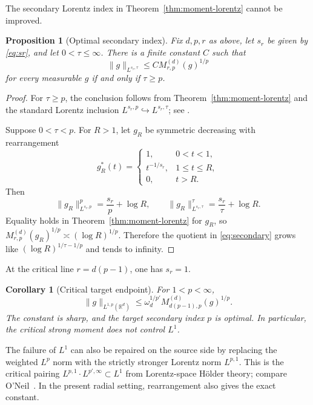\documentclass[11pt]{amsart}
\newtheorem{proposition}[theorem]{Proposition}
\newtheorem{corollary}[theorem]{Corollary}
\theoremstyle{remark}
\newcommand{\R}{\mathbb R}
\newcommand{\norm}[1]{\lVert #1\rVert}
\newcommand{\Mrp}{M_{r,p}^{(d)}}
\renewcommand{\Mc}{M_{d(p-1),p}^{(d)}}
\begin{document}
The secondary Lorentz index in Theorem~\ref{thm:moment-lorentz} cannot be
improved.

\begin{proposition}[Optimal secondary index]\label{prop:secondary}
Fix $d,p,r$ as above, let $s_r$ be given by \eqref{eq:sr}, and let
$0<\tau\le\infty$.  There is a finite constant $C$ such that
\begin{equation}\label{eq:secondary}
 \norm{g}_{L^{s_r,\tau}}
 \le C\Mrp(g)^{1/p}
\end{equation}
for every measurable $g$ if and only if $\tau\ge p$.
\end{proposition}

\begin{proof}
For $\tau\ge p$, the conclusion follows from
Theorem~\ref{thm:moment-lorentz} and the standard Lorentz inclusion
$L^{s_r,p}\hookrightarrow L^{s_r,\tau}$; see
\cite{BennettSharpley}.

Suppose $0<\tau<p$.  For $R>1$, let $g_R$ be symmetric decreasing with
rearrangement
\[
 g_R^*(t)=
 \begin{cases}
  1,&0<t<1,\\
  t^{-1/s_r},&1\le t\le R,\\
  0,&t>R.
 \end{cases}
\]
Then
\[
 \norm{g_R}_{L^{s_r,p}}^p
 =\frac{s_r}{p}+\log R,
 \qquad
 \norm{g_R}_{L^{s_r,\tau}}^\tau
 =\frac{s_r}{\tau}+\log R.
\]
Equality holds in Theorem~\ref{thm:moment-lorentz} for $g_R$, so
$\Mrp(g_R)^{1/p}\asymp(\log R)^{1/p}$.  Therefore the quotient in
\eqref{eq:secondary} grows like
$(\log R)^{1/\tau-1/p}$ and tends to infinity.
\end{proof}

At the critical line $r=d(p-1)$, one has $s_r=1$.

\begin{corollary}[Critical target endpoint]\label{cor:target-endpoint}
For $1<p<\infty$,
\begin{equation}\label{eq:target-endpoint}
 \norm{g}_{L^{1,p}(\R^d)}
 \le \omega_d^{1/p'}\Mc(g)^{1/p}.
\end{equation}
The constant is sharp, and the target secondary index $p$ is optimal.
In particular, the critical strong moment does not control $L^1$.
\end{corollary}

The failure of $L^1$ can also be repaired on the source side by replacing
the weighted $L^p$ norm with the strictly stronger Lorentz norm $L^{p,1}$.
This is the critical pairing $L^{p,1}\cdot L^{p',\infty}\subset L^1$ from
Lorentz-space H\"older theory; compare O'Neil~\cite{ONeil63}.  In the
present radial setting, rearrangement also gives the exact constant.
\end{document}
